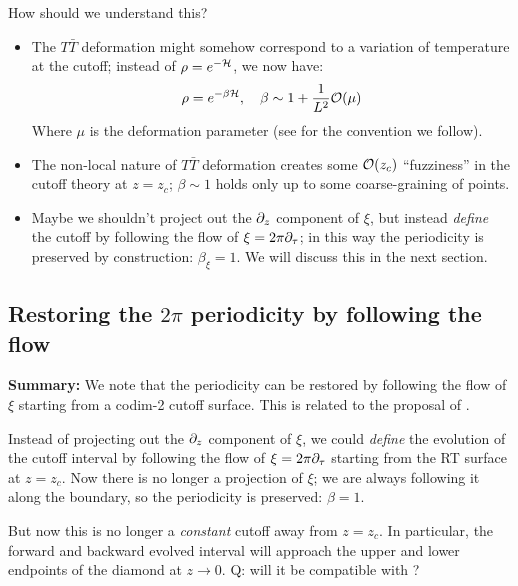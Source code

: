 \documentclass[11pt,a4paper]{article}
\begin{document}
\pagebreak[3]
	
	How should we understand this?
	\begin{itemize}
	\item The $T\bar{T}$ deformation might somehow correspond to a variation of temperature at the cutoff; instead of $\rho = e^{-\mathcal{H}}$, we now have:
	\begin{equation}
		\rho = e^{-\beta\mcal{H}},
	\quad \beta \sim 1 + \frac{1}{L^2} \order{\mu}
	\end{equation}
	Where $\mu$ is the deformation parameter (see \cite{Apolo:2019zai} for the convention we follow). 
	
	\item The non-local nature of $T\bar{T}$ deformation creates some $\order{z_c}$ ``fuzziness'' in the cutoff theory at $z = z_c$; $\beta \sim 1$ holds only up to some coarse-graining of points. 
	
	\item Maybe we shouldn't project out the $\partial_{z}$ component of $\xi$, but instead \textit{define} the cutoff by following the flow of $\xi = 2\pi\partial_{\tau}$; in this way the periodicity is preserved by construction: $\beta_\xi = 1$. We will discuss this in the next section. 
	\end{itemize}
	
\pagebreak
\subsection{Restoring the $2\pi$ periodicity by following the flow}
	
\textbf{Summary:} We note that the periodicity can be restored by following the flow of $\xi$ starting from a codim-2 cutoff surface. This is related to the proposal of \cite{Grado-White:2020wlb}. 
	
	Instead of projecting out the $\partial_{z}$ component of $\xi$, we could \textit{define} the evolution of the cutoff interval by following the flow of $\xi = 2\pi\partial_{\tau}$ starting from the RT surface at $z = z_c$. Now there is no longer a projection of $\xi$; we are always following it along the boundary, so the periodicity is preserved: $\beta = 1$. 
	
	But now this is no longer a \textit{constant} cutoff away from $z = z_c$. In particular, the forward and backward evolved interval will approach the upper and lower endpoints of the diamond at $z \to 0$. Q: will it be compatible with \textcite{McGough:2016lol}? 
	
\end{document}
